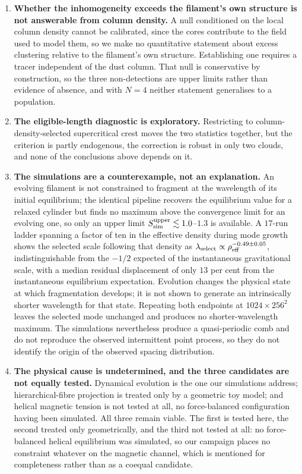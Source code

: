 \documentclass[usenatbib,twoside,twocolumn]{mnras}
\begin{document}
\begin{enumerate}
\item \textbf{Whether the inhomogeneity exceeds the filament's own structure is not answerable from column density.} A null conditioned on the local column density cannot be calibrated, since the cores contribute to the field used to model them, so we make no quantitative statement about excess clustering relative to the filament's own structure. Establishing one requires a tracer independent of the dust column. That null is conservative by construction, so the three non-detections are upper limits rather than evidence of absence, and with $N=4$ neither statement generalises to a population.
\item \textbf{The eligible-length diagnostic is exploratory.} Restricting to column-density-selected supercritical crest moves the two statistics together, but the criterion is partly endogenous, the correction is robust in only two clouds, and none of the conclusions above depends on it.
\item \textbf{The simulations are a counterexample, not an explanation.} An evolving filament is not constrained to fragment at the wavelength of its initial equilibrium; the identical pipeline recovers the equilibrium value for a relaxed cylinder but finds no maximum above the convergence limit for an evolving one, so only an upper limit $S_{\rm sim}^{\rm upper}\lesssim1.0$--$1.3$ is available. A $17$-run ladder spanning a factor of ten in the effective density during mode growth shows the selected scale following that density as $\lambda_{\rm select}\propto\rho_{\rm eff}^{-0.49\pm0.05}$, indistinguishable from the $-1/2$ expected of the instantaneous gravitational scale, with a median residual displacement of only $13$ per cent from the instantaneous equilibrium expectation. Evolution changes the physical state at which fragmentation develops; it is not shown to generate an intrinsically shorter wavelength for that state. Repeating both endpoints at $1024\times256^2$ leaves the selected mode unchanged and produces no shorter-wavelength maximum. The simulations nevertheless produce a quasi-periodic comb and do not reproduce the observed intermittent point process, so they do not identify the origin of the observed spacing distribution.
\item \textbf{The physical cause is undetermined, and the three candidates are not equally tested.} Dynamical evolution is the one our simulations address; hierarchical-fibre projection is treated only by a geometric toy model; and helical magnetic tension is not tested at all, no force-balanced configuration having been simulated. All three remain viable. The first is tested here, the second treated only geometrically, and the third not tested at all: no force-balanced helical equilibrium was simulated, so our campaign places no constraint whatever on the magnetic channel, which is mentioned for completeness rather than as a coequal candidate.
\end{enumerate}
\end{document}
